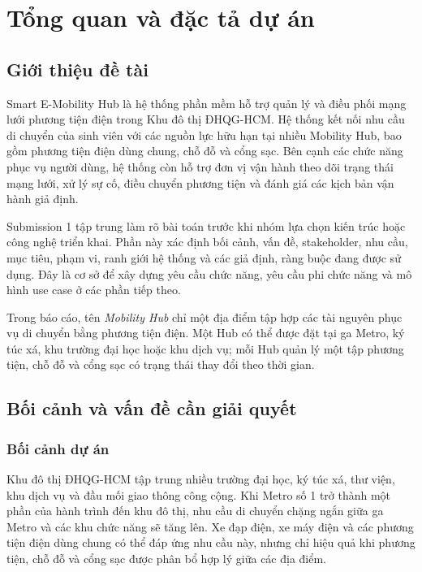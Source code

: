 \section{Tổng quan và đặc tả dự án}

\subsection{Giới thiệu đề tài}

Smart E-Mobility Hub là hệ thống phần mềm hỗ trợ quản lý và điều phối mạng lưới phương tiện điện trong Khu đô thị ĐHQG-HCM. Hệ thống kết nối nhu cầu di chuyển của sinh viên với các nguồn lực hữu hạn tại nhiều Mobility Hub, bao gồm phương tiện điện dùng chung, chỗ đỗ và cổng sạc. Bên cạnh các chức năng phục vụ người dùng, hệ thống còn hỗ trợ đơn vị vận hành theo dõi trạng thái mạng lưới, xử lý sự cố, điều chuyển phương tiện và đánh giá các kịch bản vận hành giả định.

Submission 1 tập trung làm rõ bài toán trước khi nhóm lựa chọn kiến trúc hoặc công nghệ triển khai. Phần này xác định bối cảnh, vấn đề, stakeholder, nhu cầu, mục tiêu, phạm vi, ranh giới hệ thống và các giả định, ràng buộc đang được sử dụng. Đây là cơ sở để xây dựng yêu cầu chức năng, yêu cầu phi chức năng và mô hình use case ở các phần tiếp theo.

Trong báo cáo, tên \textit{Mobility Hub} chỉ một địa điểm tập hợp các tài nguyên phục vụ di chuyển bằng phương tiện điện. Một Hub có thể được đặt tại ga Metro, ký túc xá, khu trường đại học hoặc khu dịch vụ; mỗi Hub quản lý một tập phương tiện, chỗ đỗ và cổng sạc có trạng thái thay đổi theo thời gian.

\subsection{Bối cảnh và vấn đề cần giải quyết}

\subsubsection*{Bối cảnh dự án}

Khu đô thị ĐHQG-HCM tập trung nhiều trường đại học, ký túc xá, thư viện, khu dịch vụ và đầu mối giao thông công cộng. Khi Metro số 1 trở thành một phần của hành trình đến khu đô thị, nhu cầu di chuyển chặng ngắn giữa ga Metro và các khu chức năng sẽ tăng lên. Xe đạp điện, xe máy điện và các phương tiện điện dùng chung có thể đáp ứng nhu cầu này, nhưng chỉ hiệu quả khi phương tiện, chỗ đỗ và cổng sạc được phân bổ hợp lý giữa các địa điểm.

